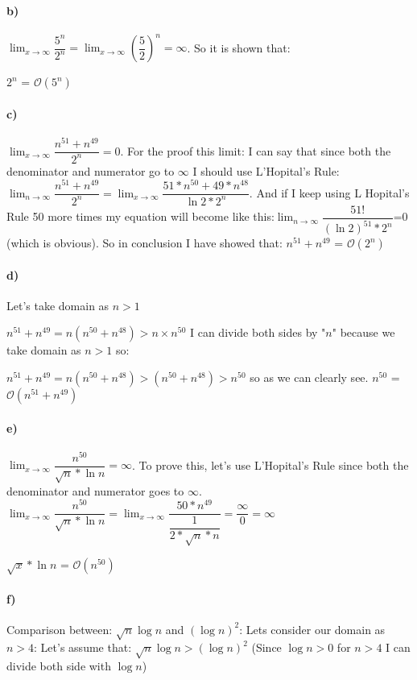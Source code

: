 \documentclass[12pt]{article}
\begin{document}
\paragraph{b)} %
$\lim_{x \to \infty} \dfrac {5^n}{2^n}=\lim_{x \to \infty} (\dfrac {5}{2} ) ^n=\infty$.  So it is shown that:

$2^n$ = $\mathcal{O}(5^n)$


\paragraph{c)}
$\lim_{x \to \infty} \dfrac{n^{51}+n^{49}}{2^n}=0$. For the proof this limit: I can say that since both the denominator and numerator go to $\infty$ I should use L'Hopital's Rule: $\lim_{n \to \infty} \dfrac{n^{51}+n^{49}}{2^n}=\lim_{x \to \infty} \dfrac{51*n^{50}+49*n^{48}}{\ln 2 *2^n}$. And if I keep using L Hopital's Rule 50 more times my equation will become like this:$\lim_{n \to \infty} \dfrac{51!}{(\ln 2 )^{51}*2^n}$=0 (which is obvious). So in conclusion I have showed that:  $n^{51}+n^{49}$ = $\mathcal{O}(2^n)$





\paragraph{d)}
Let's  take domain as $n>1$

$n^{51}+n^{49}=n(n^{50}+n^{48})>n\times n^{50}$ I can divide both sides by "$n$" because we take domain as $n>1$ so:

$n^{51}+n^{49}=n(n^{50}+n^{48})>(n^{50}+n^{48})>n^{50}$ so as we can clearly see. $n^{50}$ = $\mathcal{O}(n^{51}+n^{49})$


\paragraph{e)}
$\lim_{x \to \infty} \dfrac{n^{50}}{\sqrt{n}*\ln n}=\infty$. To prove this, let's use L'Hopital's Rule since both the denominator and numerator goes to $\infty$. $\lim_{x \to \infty} \dfrac{n^{50}}{\sqrt{n}*\ln n}=\lim_{x \to \infty} \dfrac{50*n^{49}}{\dfrac{1}{2*\sqrt{n}*n}}=\dfrac {\infty}{0}=\infty$

 $\sqrt{x}*\ln n$ = $\mathcal{O}(n^50)$


\paragraph{f)}
Comparison between: $\sqrt{n}\log n$ and $(\log n)^2$:
Lets consider our domain as $n>4$:
Let's assume that:
$\sqrt{n}\log n > (\log n)^2$ (Since $\log n > 0$ for $n>4$ I can divide both side with $\log n$)
\end{document}
